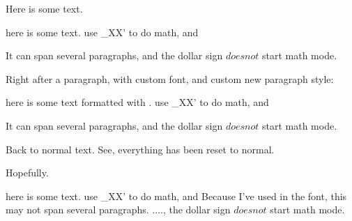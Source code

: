 \documentclass{article}
\begin{document}
Here is some text.

\begin{quotetext}
  here is some \quoted text. use _{X\to X'} to do math, and %
  
  It can span several paragraphs, and the dollar sign $ does not $ start math mode.
\end{quotetext}


\vspace*{5em}


\renewcommand\quotetextfont{\sffamily\color{red!50!black}}
\renewcommand\quotetextstart{%
  \vspace{1em}%
  \hrule height .5ex\relax%
  \vspace{0.5ex}%
  \let\oldpar\par%
  \def\par{\vspace{0.5ex}\oldpar\hrule\oldpar\vspace{0.5ex}}%
}
\renewcommand\quotetextend{%
  \vspace{0.5ex}%
  \hrule height .5ex\relax%
  \vspace{1em}%
}

Right after a paragraph, with custom font, and custom new paragraph style:
\begin{quotetext}
  here is some \quoted text formatted with \sffamily. use _{X\to X'} to do
  math, and %
  
  It can span several paragraphs, and the dollar sign $ does not $ start math mode.
\end{quotetext}


Back to normal text. See, everything has been reset to normal.

Hopefully.


\renewcommand\quotetextfont[1]{%
  \sffamily\sout{#1}%
}
\renewcommand\quotetextstart{}
\renewcommand\quotetextend{}

\begin{quotetext}
  here is some \quoted text. use _{X\to X'} to do math, and %
%
  Because I've used \sout{} in the font, this may not span several paragraphs.  ...., the
  dollar sign $ does not $ start math mode.
\end{quotetext}
\end{document}
